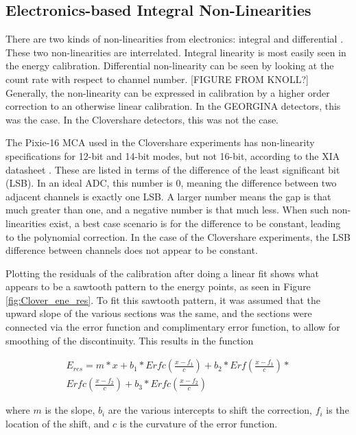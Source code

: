 \subsection{Electronics-based Integral Non-Linearities}

There are two kinds of non-linearities from electronics: integral and differential \citep{knoll00:rad_det_meas}. These two non-linearities are interrelated. Integral linearity is most easily seen in the energy calibration. Differential non-linearity can be seen by looking at the count rate with respect to channel number. [FIGURE FROM KNOLL?] Generally, the non-linearity can be expressed in calibration by a higher order correction to an otherwise linear calibration. In the GEORGINA detectors, this was the case. In the Clovershare detectors, this was not the case. 

The Pixie-16 MCA used in the Clovershare experiments has non-linearity specifications for 12-bit and 14-bit modes, but not 16-bit, according to the XIA datasheet \citep{xia:_pixie}. These are listed in terms of the difference of the least significant bit (LSB). In an ideal ADC, this number is 0, meaning the difference between two adjacent channels is exactly one LSB. A larger number means the gap is that much greater than one, and a negative number is that much less. When such non-linearities exist, a best case scenario is for the difference to be constant, leading to the polynomial correction. In the case of the Clovershare experiments, the LSB difference between channels does not appear to be constant.

Plotting the residuals of the calibration after doing a linear fit shows what appears to be a sawtooth pattern to the energy points, as seen in Figure \ref{fig:Clover_ene_res}. To fit this sawtooth pattern, it was assumed that the upward slope of the various sections was the same, and the sections were connected via the error function and complimentary error function, to allow for smoothing of the discontinuity. This results in the function

\begin{equation}
    \begin{aligned}
    	E_{res}= m*x+b_1*Erfc\left(\frac{x-f_1}{c}\right)+b_2*Erf\left(\frac{x-f_1}{c}\right)*\\Erfc\left(\frac{x-f_2}{c}\right)+b_3*Erfc\left(\frac{x-f_2}{c}\right)
    \end{aligned}
\end{equation}

where $m$ is the slope, $b_i$ are the various intercepts to shift the correction, $f_i$ is the location of the shift, and $c$ is the curvature of the error function.

